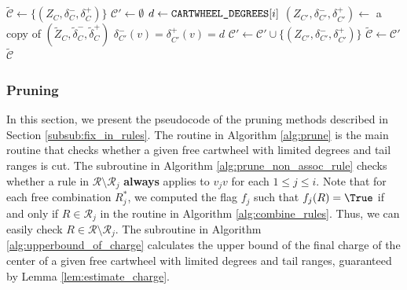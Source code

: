\documentclass[main.tex]{subfiles}
\begin{document}
\begin{algorithm}[H]
    \caption{\concreteDegreeExceptTailWithLink($(Z_C, \delta_C^-, \delta_C^+)$)}
    \label{alg:concrete_degree}
    \begin{algorithmic}[1]
        \State $\tilde{\mathcal{C}} \gets \{(Z_C, \delta_C^-, \delta_C^+)\}$
                \Continue
            \EndIf
            \State $\mathcal{C}' \gets \emptyset$
                \State $d \gets \texttt{CARTWHEEL\_DEGREES}[i]$
                         \State $(Z_{C'}, \delta_{C'}^-, \delta_{C'}^+) \gets$ a copy of $(\tilde{Z}_C, \tilde{\delta}_C^-, \tilde{\delta}_C^+)$
                         \State $\delta_{C'}^-(v)=\delta_{C'}^+(v)=d$
                         \State $\mathcal{C}' \gets \mathcal{C}' \cup \{(Z_{C'}, \delta_{C'}^-, \delta_{C'}^+)\}$
                    \EndFor
                \EndIf
            \EndFor
            \State $\tilde{\mathcal{C}} \gets \mathcal{C}'$
        \EndFor
        \State \Return $\tilde{\mathcal{C}}$
    \end{algorithmic}
\end{algorithm}

\subsubsection{Pruning}
In this section, we present the pseudocode of the pruning methods described in Section \ref{subsub:fix_in_rules}.
The \prune routine in Algorithm \ref{alg:prune} is the main routine that checks whether a given free cartwheel with limited degrees and tail ranges is cut.
The \pruneByNonAssociatedRule subroutine in Algorithm \ref{alg:prune_non_assoc_rule} checks whether a rule in $\mathcal{R} \setminus \mathcal{R}_j$ {\bf always} applies to $v_jv$ for each $1 \leq j \leq i$.
Note that for each free combination $R_j^*$, we computed the flag $f_j$ such that $f_j(R)=\True$ if and only if $R \in \mathcal{R}_j$ in the \combineRules routine in Algorithm \ref{alg:combine_rules}.
Thus, we can easily check $R \in \mathcal{R} \setminus \mathcal{R}_j$.
The \upperBoundOfCharge subroutine in Algorithm \ref{alg:upperbound_of_charge} calculates the upper bound of the final charge of the center of a given free cartwheel with limited degrees and tail ranges, guaranteed by Lemma \ref{lem:estimate_charge}.
\end{document}
